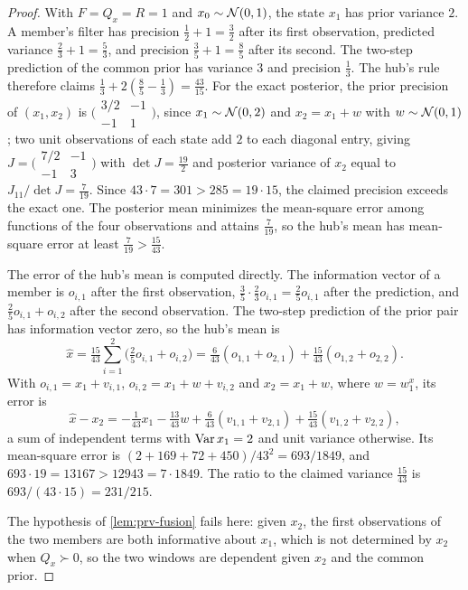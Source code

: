 \begin{proof}
With $F=Q_x=R=1$ and $x_0\sim\mathcal{N}(0,1)$, the state $x_1$ has prior variance $2$. A member's filter has precision $\frac12+1=\frac32$ after its first observation, predicted variance $\frac23+1=\frac53$, and precision $\frac35+1=\frac85$ after its second. The two-step prediction of the common prior has variance $3$ and precision $\frac13$. The hub's rule therefore claims $\frac13+2(\frac85-\frac13)=\frac{43}{15}$. For the exact posterior, the prior precision of $(x_1,x_2)$ is $\bigl(\begin{smallmatrix}3/2&-1\\-1&1\end{smallmatrix}\bigr)$, since $x_1\sim\mathcal{N}(0,2)$ and $x_2=x_1+w$ with $w\sim\mathcal{N}(0,1)$; two unit observations of each state add $2$ to each diagonal entry, giving $J=\bigl(\begin{smallmatrix}7/2&-1\\-1&3\end{smallmatrix}\bigr)$ with $\det J=\frac{19}2$ and posterior variance of $x_2$ equal to $J_{11}/\det J=\frac7{19}$. Since $43\cdot7=301>285=19\cdot15$, the claimed precision exceeds the exact one. The posterior mean minimizes the mean-square error among functions of the four observations and attains $\frac7{19}$, so the hub's mean has mean-square error at least $\frac7{19}>\frac{15}{43}$.

The error of the hub's mean is computed directly. The information vector of a member is $o_{i,1}$ after the first observation, $\frac35\cdot\frac23o_{i,1}=\frac25o_{i,1}$ after the prediction, and $\frac25o_{i,1}+o_{i,2}$ after the second observation. The two-step prediction of the prior pair has information vector zero, so the hub's mean is
\[
\hat x=\tfrac{15}{43}\sum_{i=1}^2\bigl(\tfrac25o_{i,1}+o_{i,2}\bigr)=\tfrac{6}{43}(o_{1,1}+o_{2,1})+\tfrac{15}{43}(o_{1,2}+o_{2,2}).
\]
With $o_{i,1}=x_1+v_{i,1}$, $o_{i,2}=x_1+w+v_{i,2}$ and $x_2=x_1+w$, where $w=w^x_1$, its error is
\[
\hat x-x_2=-\tfrac1{43}x_1-\tfrac{13}{43}w+\tfrac6{43}(v_{1,1}+v_{2,1})+\tfrac{15}{43}(v_{1,2}+v_{2,2}),
\]
a sum of independent terms with $\operatorname{Var} x_1=2$ and unit variance otherwise. Its mean-square error is $(2+169+72+450)/43^2=693/1849$, and $693\cdot19=13167>12943=7\cdot1849$. The ratio to the claimed variance $\frac{15}{43}$ is $693/(43\cdot15)=231/215$.

The hypothesis of \cref{lem:prv-fusion} fails here: given $x_2$, the first observations of the two members are both informative about $x_1$, which is not determined by $x_2$ when $Q_x\succ0$, so the two windows are dependent given $x_2$ and the common prior.
\end{proof}

